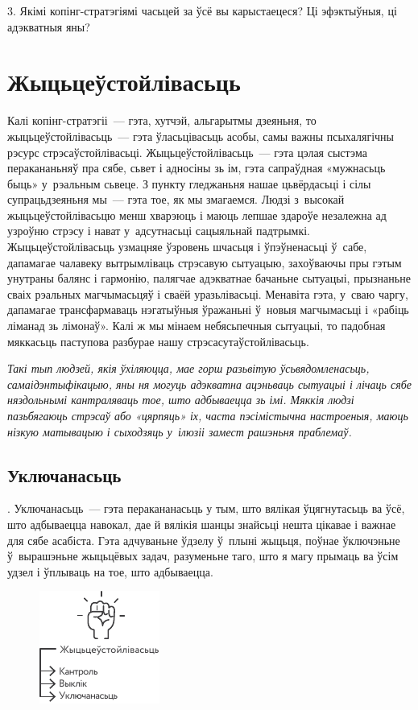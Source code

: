3. Якімі копінг-стратэгіямі часьцей за ўсё вы карыстаецеся? Ці эфэктыўныя, ці адэкватныя яны?


\section{Жыцьцеўстойлівасьць}

Калі копінг-стратэгіі~--- гэта, хутчэй, альгарытмы дзеяньня, то жыцьцеўстойлівасьць~--- гэта ўласьцівасьць асобы, самы важны псыхалягічны рэсурс стрэсаўстойлівасьці. Жыцьцеўстойлівасьць~--- гэта цэлая сыстэма перакананьняў пра сябе, сьвет і адносіны зь ім, гэта сапраўдная «мужнасьць быць» у~рэальным сьвеце. З пункту гледжаньня нашае цьвёрдасьці і сілы супрацьдзеяньня мы~--- гэта тое, як мы змагаемся. Людзі з~высокай жыцьцеўстойлівасьцю менш хварэюць і маюць лепшае здароўе незалежна ад узроўню стрэсу і нават у~адсутнасьці сацыяльнай падтрымкі. Жыцьцеўстойлівасьць узмацняе ўзровень шчасьця і ўпэўненасьці ў~сабе, дапамагае чалавеку вытрымліваць стрэсавую сытуацыю, захоўваючы пры гэтым унутраны балянс і гармонію, палягчае адэкватнае бачаньне сытуацыі, прызнаньне сваіх рэальных магчымасьцяў і сваёй уразьлівасьці. Менавіта гэта, у~сваю чаргу, дапамагае трансфармаваць нэгатыўныя ўражаньні ў~новыя магчымасьці і «рабіць ліманад зь лімонаў». Калі ж мы мінаем небясьпечныя сытуацыі, то падобная мяккасьць паступова разбурае нашу стрэсасутаўстойлівасьць.

\emph{Такі тып людзей, якія ўхіляюцца, мае горш разьвітую ўсьвядомленасьць, самаідэнтыфікацыю, яны ня могуць адэкватна ацэньваць сытуацыі і лічаць сябе няздольнымі кантраляваць тое, што адбываецца зь імі. Мяккія людзі пазьбягаюць стрэсаў або «цярпяць» іх, часта пэсімістычна настроеныя, маюць нізкую матывацыю і сыходзяць у~ілюзіі замест рашэньня праблемаў.}


\subsection*{Уключанасьць}. Уключанасьць~--- гэта перакананасьць у тым, што вялікая ўцягнутасьць ва ўсё, што адбываецца навокал, дае й вялікія шанцы знайсьці нешта цікавае і важнае для сябе асабіста. Гэта адчуваньне ўдзелу ў~плыні жыцьця, поўнае ўключэньне ў~вырашэньне жыцьцёвых задач, разуменьне таго, што я магу прымаць ва ўсім удзел і ўплываць на тое, што адбываецца. 

\begin{figure}[htb!]
  \centering
  \includegraphics[scale=1.5]{willpower/ch7/14.pdf}
\end{figure}

